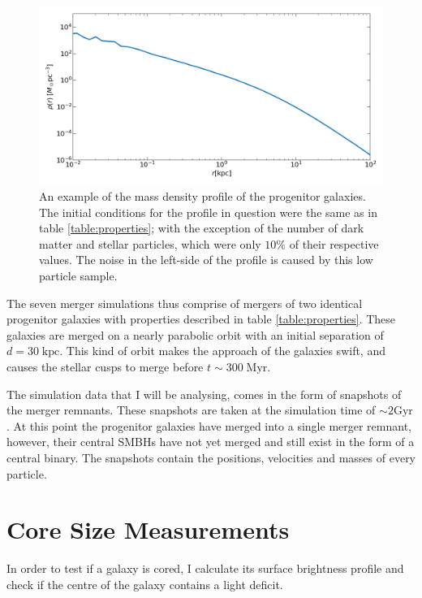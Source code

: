 \documentclass[english, twoside]{HYgradu}
\begin{document}
\begin{figure}
	\centering
	\includegraphics[width=\textwidth]{IC.png}
	\caption{An example of the mass density profile of the progenitor galaxies. The initial conditions for the profile in question were the same as in table \ref{table:properties}; with the exception of the number of dark matter and stellar particles, which were only $10\%$ of their respective values. The noise in the left-side of the profile is caused by this low particle sample.}
	\label{figure:IC_density_profile}
\end{figure}

The seven merger simulations thus comprise of mergers of two identical progenitor galaxies with properties described in table \ref{table:properties}. These galaxies are merged on a nearly parabolic orbit with an initial separation of $d = 30 \; \mathrm{kpc}$. This kind of orbit makes the approach of the galaxies swift, and causes the stellar cusps to merge before $t \sim 300 \; \mathrm{Myr}$.

The simulation data that I will be analysing, comes in the form of snapshots of the merger remnants. These snapshots are taken at the simulation time of $\sim 2 \mathrm{Gyr}$. At this point the progenitor galaxies have merged into a single merger remnant, however, their central SMBHs have not yet merged and still exist in the form of a central binary. The snapshots contain the positions, velocities and masses of every particle.

\section{Core Size Measurements}

In order to test if a galaxy is cored, I calculate its surface brightness profile and check if the centre of the galaxy contains a light deficit.
\end{document}
